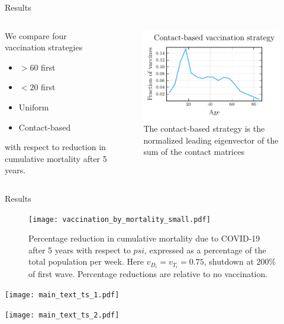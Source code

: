 \documentclass{beamer}
\begin{document}
\begin{frame}{Results}
    \begin{columns}
        \begin{column}{0.5\textwidth}
            We compare four vaccination strategies
            \begin{itemize}
                \item $>60$ first
                \item $<20$ first
                \item Uniform
                \item Contact-based
            \end{itemize}
            with respect to reduction in cumulative mortality after 5 years.
        \end{column}
        \begin{column}{0.5\textwidth}
        \begin{figure}
            \includegraphics[width = \textwidth]{leading_eigenvector.pdf}
            \caption{  The contact-based strategy is the normalized leading eigenvector of the sum of the contact matrices}
        \end{figure}

      
        \end{column}

    \end{columns}


\end{frame}
\begin{frame}{Results}
            \begin{figure}
                \texttt{[image: vaccination\_by\_mortality\_small.pdf]}
                
                \caption{Percentage reduction in cumulative mortality due to COVID-19 after 5 years with respect to $psi$, expressed as a percentage of the total population per week. Here $v_{D_i} = v_{T_i} = 0.75 $, shutdown at $200\%$ of first wave. Percentage reductions are relative to no vaccination. }
            \end{figure}
\end{frame}
\begin{frame}{}
    \texttt{[image: main\_text\_ts\_1.pdf]}
\end{frame}
\begin{frame}{}
    \texttt{[image: main\_text\_ts\_2.pdf]}
\end{frame}
\end{document}
